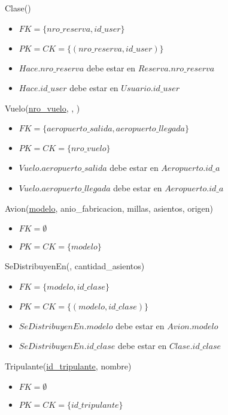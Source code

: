 \vspace*{0.5cm}
\noindent
Clase(\underline{})
\begin{itemize}
	\item $FK = \{nro\_reserva, id\_user\}$
	\item $PK = CK = \{(nro\_reserva, id\_user)\}$
	\item $Hace.nro\_reserva$ debe estar en $Reserva.nro\_reserva$
	\item $Hace.id\_user$ debe estar en $Usuario.id\_user$
\end{itemize}


\vspace*{0.5cm}
\noindent
Vuelo(\underline{nro\_vuelo}, ,
	)
\begin{itemize}
	\item $FK = \{aeropuerto\_salida, aeropuerto\_llegada\}$
	\item $PK = CK = \{nro\_vuelo\}$
	\item $Vuelo.aeropuerto\_salida$ debe estar en $Aeropuerto.id\_a$
	\item $Vuelo.aeropuerto\_llegada$ debe estar en $Aeropuerto.id\_a$
\end{itemize}

\vspace*{0.5cm}
\noindent
Avion(\underline{modelo}, anio\_fabricacion, millas, asientos, origen)
\begin{itemize}
	\item $FK = \emptyset$
	\item $PK = CK = \{modelo\}$
\end{itemize}

\vspace*{0.5cm}
\noindent
SeDistribuyenEn(\underline{},
	cantidad\_asientos)
\begin{itemize}
	\item $FK = \{modelo, id\_clase\}$
	\item $PK = CK = \{(modelo, id\_clase)\}$
	\item $SeDistribuyenEn.modelo$ debe estar en $Avion.modelo$
	\item $SeDistribuyenEn.id\_clase$ debe estar en $Clase.id\_clase$
\end{itemize}

\vspace*{0.5cm}
\noindent
Tripulante(\underline{id\_tripulante}, nombre)
\begin{itemize}
	\item $FK = \emptyset$
	\item $PK = CK = \{id\_tripulante\}$
\end{itemize}


